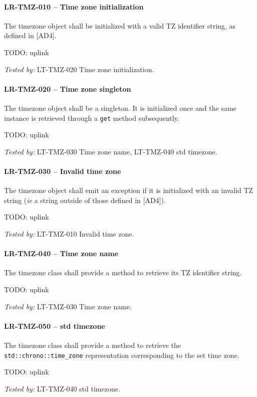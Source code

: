 \paragraph{LR-TMZ-010 -- Time zone initialization}
The timezone object shall be initialized with a valid TZ identifier string,
as defined in [AD4].

TODO: uplink

\textit{Tested by: } LT-TMZ-020 Time zone initialization.

\paragraph{LR-TMZ-020 -- Time zone singleton}
The timezone object shall be a singleton. It is initialized once and the same
instance is retrieved through a \lstinline{get} method subsequently.

TODO: uplink

\textit{Tested by: } LT-TMZ-030 Time zone name, LT-TMZ-040 std
time\textunderscore zone.

\paragraph{LR-TMZ-030 -- Invalid time zone}
The timezone object shall emit an exception if it is initialized with
an invalid TZ string (\textit{ie} a string outside of those defined in [AD4]).

TODO: uplink

\textit{Tested by: } LT-TMZ-010 Invalid time zone.

\paragraph{LR-TMZ-040 -- Time zone name}
The timezone class shall provide a method to retrieve its TZ identifier string.

TODO: uplink

\textit{Tested by: } LT-TMZ-030 Time zone name.

\paragraph{LR-TMZ-050 -- std time\textunderscore zone}
The timezone class shall provide a method to retrieve the
\lstinline{std::chrono::time_zone} representation corresponding to the set
time zone.

TODO: uplink

\textit{Tested by: } LT-TMZ-040 std time\textunderscore zone.

